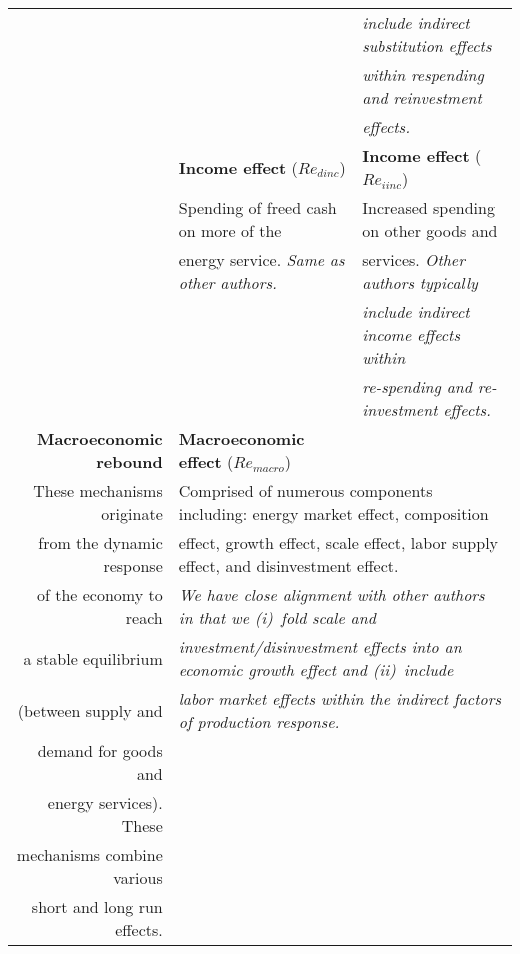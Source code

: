 \begin{table}
\begin{center}
\begin{tabular}{ r l l }
                                   &                                             & \emph{include indirect substitution effects} \\
                                   &                                             & \emph{within respending and reinvestment} \\ 
                                   &                                             & \emph{effects.} \\ 
                                   \cmidrule{2-3}
                                   & \textbf{Income effect} ($Re_{dinc}$)        & \textbf{Income effect} ($Re_{iinc}$) \\
                                   & Spending of freed cash on more of the       & Increased spending on other goods and \\
                                   & energy service. \emph{Same as other authors.} & services. \emph{Other authors typically} \\
                                   &                                             & \emph{include indirect income effects within} \\ 
                                   &                                             & \emph{re-spending and re-investment effects.} \\
                                   \cmidrule{2-3}
\textbf{Macroeconomic rebound}     & \textbf{Macroeconomic effect} ($Re_{macro}$)  & \\
These mechanisms originate         & \multicolumn{2}{l}{Comprised of numerous components including: energy market effect, composition} \\
from the dynamic response          & \multicolumn{2}{l}{effect, growth effect, scale effect, labor supply effect, and disinvestment effect.} \\
of the economy to reach            & \multicolumn{2}{l}{\emph{We have close alignment with other authors in that we (i)~fold scale and}} \\
a stable equilibrium               & \multicolumn{2}{l}{\emph{investment/disinvestment effects into an economic growth effect and (ii)~include}} \\
(between supply and                & \multicolumn{2}{l}{\emph{labor market effects within the indirect factors of production response.}} \\
demand for goods and               & & \\
energy services). These            & & \\
mechanisms combine various         & & \\
short and long run effects.        & & \\
\bottomrule
\end{tabular}
\end{center}
\end{table}



